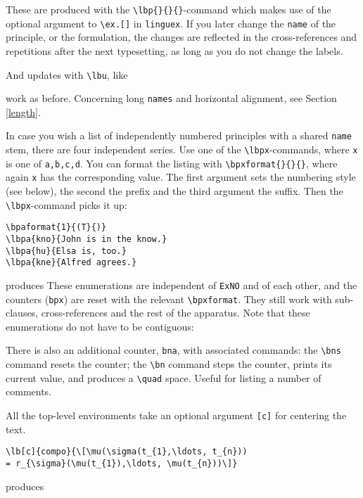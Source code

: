 \documentclass[11pt]{article}
\begin{document}
% 
%
These are produced with the \verb+\lbp{}{}{}+-command which makes use of the optional argument to \verb+\ex.[]+ in \verb+linguex+. If you later change the \verb+name+ of the principle, or the formulation, the changes are reflected in the cross-references and repetitions after the next typesetting, as long as you do not change the labels.

And updates with \verb+\lbu+, like
 
work as before. Concerning long \verb+names+ and horizontal alignment, see Section \ref{length}.

In case you  wish a list of independently numbered principles with a shared \verb+name+ stem, there are four independent series. Use one  of the \verb+\lbpx+-commands, where \verb+x+ is one of \verb+a,b,c,d+. You can format the listing with \verb+\bpxformat{}{}{}+, where again \verb+x+ has the corresponding value. The first argument sets the numbering style (see below), the second the prefix and the third argument the suffix.
	 Then the \verb+\lbpx+-command picks it up: 

\begin{verbatim}
\bpaformat{1}{(T}{)}
\lbpa{kno}{John is in the know.} 
\lbpa{hu}{Elsa is, too.} 
\lbpa{kne}{Alfred agrees.} 
\end{verbatim}
produces
These enumerations are independent of \verb+ExNO+ and of each other, and the counters (\verb+bpx+) are reset with the relevant \verb+\bpxformat+.
	 They still work with sub-clauses, cross-references and the rest of the apparatus. Note that these enumerations do not have to be contiguous: 


There  is also an additional counter, \verb+bna+, with associated commands: the \verb+\bns+ command resets the counter; the \verb+\bn+ command steps the counter, prints its current value, and produces a \verb+\quad+ space. Useful for listing a number of comments.

All the top-level  environments take an optional argument \verb+[c]+ for centering the text. 

\begin{verbatim}
\lb[c]{compo}{\[\mu(\sigma(t_{1},\ldots, t_{n}))
= r_{\sigma}(\mu(t_{1}),\ldots, \mu(t_{n}))\]}
\end{verbatim}
produces
\end{document}

